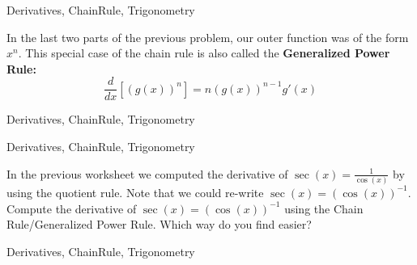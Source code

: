 \begin{tagblock}{Derivatives, ChainRule, Trigonometry}
\begin{question}
In the last two parts of the previous problem, our outer function was of the form $x^n$.  This special case of the chain rule is also called the \textbf{Generalized Power Rule:}  \[\frac{d}{dx}[(g(x))^n]= n(g(x))^{n-1} g'(x) \]


	
\begin{tags}
	    Derivatives, ChainRule, Trigonometry
\end{tags}
	
\begin{diary}
\end{diary}
	
\begin{solution}
	   
\end{solution}
	
\end{question}

\end{tagblock}



	
\begin{tagblock}{Derivatives, ChainRule, Trigonometry}
\begin{question}
	

In the previous worksheet  we computed the derivative of $\displaystyle \sec(x) = \frac{1}{\cos(x)}$ by using the quotient rule.  Note that we could re-write $\sec(x) = (\cos(x))^{-1}$.  Compute the derivative of  $\sec(x) = (\cos(x))^{-1}$ using the Chain Rule/Generalized Power Rule.  Which way do you find easier? 


	
\begin{tags}
	    Derivatives, ChainRule, Trigonometry
\end{tags}
	
\begin{diary}
\end{diary}
	
\begin{solution}
	   
\end{solution}
	
\end{question}

\end{tagblock}


